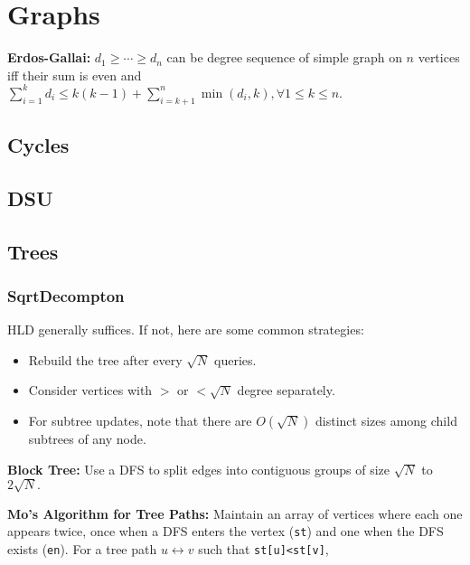\chapter{Graphs}

\textbf{Erdos-Gallai:} $d_1\geq\cdots\geq d_n$ can be degree sequence of simple graph on $n$ vertices iff their sum is even and $\sum_{i=1}^{k}d_{i}\leq k(k-1)+\sum _{i=k+1}^{n}\min(d_{i},k), \forall 1\le k\le n.$

\section{Cycles}

\section{DSU}

\section{Trees}

	\subsection{SqrtDecompton}

		HLD generally suffices. If not, here are some common strategies:
		
		\begin{itemize}
			\item Rebuild the tree after every $\sqrt N$ queries. %
			\item Consider vertices with $>$ or $<\sqrt N$ degree separately. %
			\item For subtree updates, note that there are $O(\sqrt N)$ distinct sizes among child subtrees of any node.
		\end{itemize}

		\textbf{Block Tree:} Use a DFS to split edges into contiguous groups of size $\sqrt N$ to $2\sqrt N.$

		\textbf{Mo's Algorithm for Tree Paths:} Maintain an array of vertices where each one appears twice, once when a DFS enters the vertex (\texttt{st}) and one when the DFS exists (\texttt{en}). For a tree path $u\leftrightarrow v$ such that \texttt{st[u]<st[v]},


